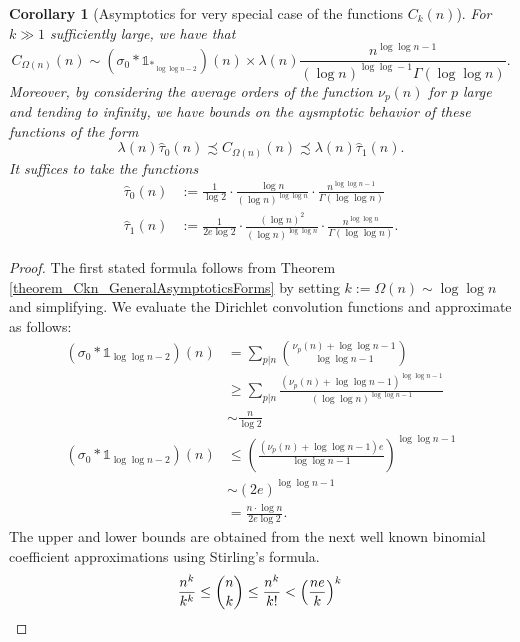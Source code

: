 \documentclass[11pt,reqno,a4letter]{article}
\numberwithin{figure}{section}
\numberwithin{table}{section}
\theoremstyle{plain}
\newtheorem{cor}[theorem]{Corollary}
\numberwithin{theorem}{section}
\theoremstyle{definition}
\begin{document}
\begin{cor}[Asymptotics for very special case of the functions $C_k(n)$] 
\label{cor_Asymptotics_KeyCases_Of_Ckn_v1} 
For $k \gg 1$ sufficiently large, we have that 
\[
C_{\Omega(n)}(n) \sim (\sigma_0 \ast \mathds{1}_{\ast_{\log\log n-2}})(n) \times \lambda(n) 
     \frac{n^{\log\log n -1}}{(\log n)^{\log\log -1} \Gamma(\log\log n)}. 
\]
Moreover, by considering the average orders of the function $\nu_p(n)$ for $p$ large and 
tending to infinity, we have bounds on the aysmptotic behavior of these functions 
of the form 
\[
\lambda(n)\widehat{\tau}_0(n) \precsim C_{\Omega(n)}(n) \precsim \lambda(n)\widehat{\tau}_1(n). 
\]
It suffices to take the functions 
\begin{align*} 
\widehat{\tau}_0(n) & := \frac{1}{\log 2} \cdot \frac{\log n}{(\log n)^{\log\log n}} \cdot 
     \frac{n^{\log\log n-1}}{\Gamma(\log\log n)} \\ 
\widehat{\tau}_1(n) & := \frac{1}{2e \log 2} \cdot \frac{(\log n)^2}{(\log n)^{\log\log n}} \cdot 
     \frac{n^{\log\log n}}{\Gamma(\log\log n)}. 
\end{align*} 
\end{cor} 
\begin{proof} 
The first stated formula follows from 
Theorem \ref{theorem_Ckn_GeneralAsymptoticsForms} by setting 
$k := \Omega(n) \sim \log\log n$ and simplifying. We evaluate the Dirichlet convolution 
functions and approximate as follows: 
\begin{align*} 
(\sigma_0 \ast \mathds{1}_{\log\log n-2})(n) & = \sum_{p|n} \binom{\nu_p(n) + \log\log n-1}{\log\log n-1} \\ 
     & \geq \sum_{p|n} \frac{(\nu_p(n) + \log\log n-1)^{\log\log n-1}}{(\log\log n)^{\log\log n-1}} \\ 
     & \sim \frac{n}{\log 2} \\ 
(\sigma_0 \ast \mathds{1}_{\log\log n-2})(n) & \leq \left(
     \frac{(\nu_p(n) + \log\log n-1)e}{\log\log n-1} 
     \right)^{\log\log n -1} \\ 
     & \sim (2e)^{\log\log n-1} \\ 
     & = \frac{n \cdot \log n}{2e \log 2}.    
\end{align*} 
The upper and lower bounds are obtained from the next well known binomial coefficient approximations 
using Stirling's formula. 
\[
\frac{n^k}{k^k} \leq \binom{n}{k} \leq \frac{n^k}{k!} < \left(\frac{ne}{k}\right)^k 
     \qedhere 
\]
\end{proof} 

\newpage 
\end{document}
